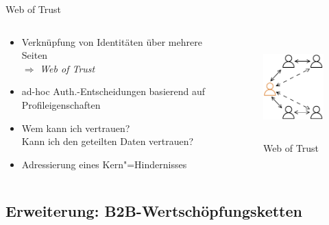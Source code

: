 \begin{frame}{Web of Trust \footnotesize\cite{sambraSolidPlatformDecentralized2016}}
    \begin{columns}
        \begin{column}{0.6\textwidth}
            \begin{itemize}
                \item Verknüpfung von Identitäten über mehrere Seiten\\
                $\Rightarrow$ \emph{Web of Trust}
                
                \item[$\Rightarrow$]<2-> ad-hoc Auth.-Entscheidungen basierend auf Profileigenschaften
                
                \item[$\Rightarrow$]<3-> Wem kann ich vertrauen?\\ Kann ich den geteilten Daten vertrauen?
                
                \item[$\Rightarrow$]<4-> Adressierung eines Kern"=Hindernisses
            \end{itemize}
        \end{column}
        
        \begin{column}{0.4\textwidth}
            \vspace{1em}
            \begin{figure}
                \includegraphics[height=4cm]{./assets/web_of_trust.drawio.pdf}
                \caption{Web of Trust}
            \end{figure}
        \end{column}
    \end{columns}
\end{frame}


\subsection{Erweiterung: B2B-Wertschöpfungsketten}

